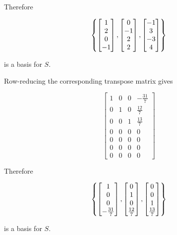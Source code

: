 \documentclass[a4paper,12pt]{article}
\begin{document}
\begin{exm}
  Therefore
  
  $$\left\{ \begin{bmatrix}
    1\\
    2\\
    0\\
    -1
  \end{bmatrix},\begin{bmatrix}
    0\\
    -1\\
    2\\
    2
  \end{bmatrix},\begin{bmatrix}
    -1\\
    3\\
    -3\\
    4
  \end{bmatrix}\right\}$$\s

  is a basis for $S$.\n

   Row-reducing the corresponding transpose matrix gives

  $$\begin{bmatrix}
    1 & 0 & 0 & -\frac{31}{7}\\
    0 & 1 & 0 & \frac{12}{7}\\
    0 & 0 & 1 & \frac{13}{7}\\
    0 & 0 & 0 & 0\\
    0 & 0 & 0 & 0\\
    0 & 0 & 0 & 0\\
    0 & 0 & 0 & 0
  \end{bmatrix}$$\s

  Therefore
  
  $$\left\{ \begin{bmatrix}
    1\\
    0\\
    0\\
    -\frac{31}{7}
  \end{bmatrix},\begin{bmatrix}
    0\\
    1\\
    0\\
    \frac{12}{7}
  \end{bmatrix},\begin{bmatrix}
    0\\
    0\\
    1\\
    \frac{13}{7}
  \end{bmatrix}\right\}$$\s

  is a basis for $S$.
\end{exm}\n
\end{document}
